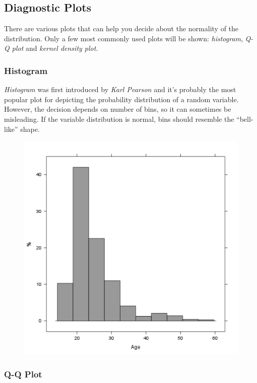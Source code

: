 \documentclass{article}
\makeatletter
\def\maxwidth{\ifdim\Gin@nat@width>\linewidth\linewidth
\else\Gin@nat@width\fi}
\let\Oldincludegraphics\includegraphics
\renewcommand{\includegraphics}[1]{\Oldincludegraphics[width=\maxwidth]{#1}}
\makeatother
\begin{document}
\subsection{Diagnostic Plots}

There are various plots that can help you decide about the normality of
the distribution. Only a few most commonly used plots will be shown:
\emph{histogram}, \emph{Q-Q plot} and \emph{kernel density plot}.

\subsubsection{Histogram}

\emph{Histogram} was first introduced by \emph{Karl Pearson} and it's
probably the most popular plot for depicting the probability
distribution of a random variable. However, the decision depends on
number of bins, so it can sometimes be misleading. If the variable
distribution is normal, bins should resemble the ``bell-like'' shape.

\begin{figure}[htbp]
\centering
\includegraphics{ac5d789145bdef09b10219ef16429f53.png}
\caption{}
\end{figure}

\subsubsection{Q-Q Plot}
\end{document}
